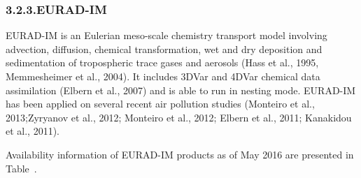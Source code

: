 \documentclass[9pt]{article}
\begin{document}
\subsubsection{3.2.3.\hspace*{0.5em}EURAD-IM}\label{sec-eurad-im}%

\noindent{}EURAD-IM is an Eulerian meso-scale chemistry transport model involving advection, diffusion, chemical transformation, wet and dry deposition and sedimentation of tropospheric trace gases and aerosols (Hass et al., 1995, Memmesheimer et al., 2004). It includes 3DVar and 4DVar chemical data assimilation (Elbern et al., 2007) and is able to run in nesting mode.
EURAD-IM has been applied on several recent air pollution studies (Monteiro et al., 2013;Zyryanov et al., 2012; Monteiro et al., 2012; Elbern et al., 2011; Kanakidou et al., 2011).%

Availability information of EURAD-IM products as of May 2016 are presented in Table~.%
\end{document}
